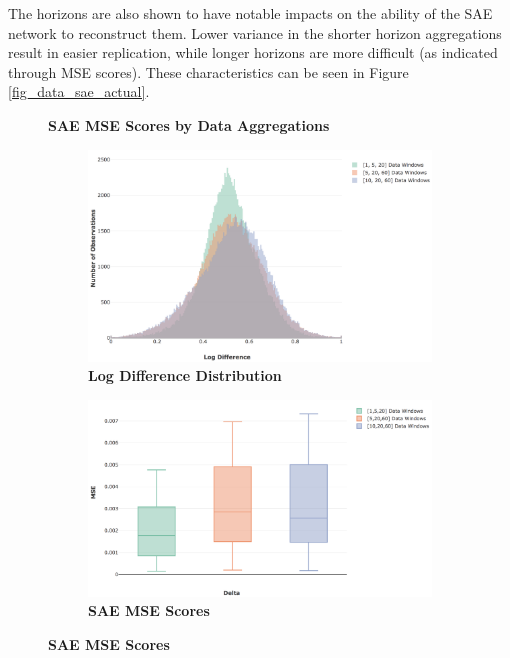 \documentclass[a4paper,11pt,oneside]{article}
\theoremstyle{plain}
\theoremstyle{definition}
\begin{document}
	The horizons are also shown to have notable impacts on the ability of the SAE network to reconstruct them. Lower variance in the shorter horizon aggregations result in easier replication, while longer horizons are more difficult (as indicated through MSE scores). These characteristics can be seen in Figure \ref{fig_data_sae_actual}.	
	
	
	\begin{figure}[H]
		\centering
		\textbf{SAE MSE Scores by Data Aggregations}
		\begin{subfigure}{.44\textwidth}
			\centering 
			\includegraphics[scale=0.29]{images/results/data/actual_aggregate_dist.png}
			\caption{\textbf{Log Difference Distribution}
				\newline }
			\label{figure-actual_aggregate_dist}
		\end{subfigure}%
		\begin{subfigure}{.5\textwidth}
			\centering 
			\includegraphics[scale=0.3]{images/results/data/actual_aggregation_mse.png}
			\caption{\textbf{SAE MSE Scores} 
				\newline }

\end{subfigure}
\end{figure}
\end{document}
